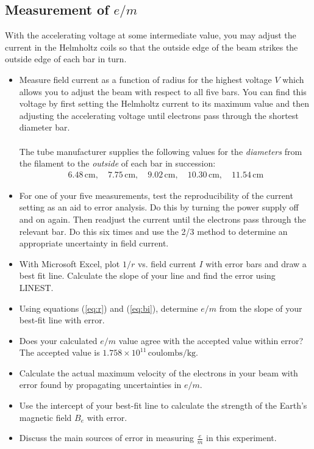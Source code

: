 \subsection{Measurement of $e/m$}
With the accelerating voltage at some intermediate value, you may adjust the current in the Helmholtz coils so that the outside edge of the beam strikes the outside edge of each bar in turn.
\begin{itemize}
  \item Measure field current as a function of radius for the highest voltage $V$ which allows you to adjust the beam with respect to all five bars. You can find this voltage by first setting the Helmholtz current to its maximum value and then adjusting the accelerating voltage until electrons pass through the shortest diameter bar.\\ \\

  The tube manufacturer supplies the following values for the \emph{diameters} from the filament to the \emph{outside} of each bar in succession:
  \begin{gather*}
  6.48\,\textrm{cm},\quad 7.75\,\textrm{cm},\quad 9.02\,\textrm{cm},\quad 10.30\,\textrm{cm},\quad 11.54\,\textrm{cm}
  \end{gather*}

  \item For one of your five measurements, test the reproducibility of the current setting as an aid to error analysis. Do this by turning the power supply off and on again. Then readjust the current until the electrons pass through the relevant bar. Do this six times and use the 2/3 method to determine an appropriate uncertainty in field current.

  \item With Microsoft Excel, plot $1/r$ vs. field current $I$ with error bars and draw a best fit line. Calculate the slope of your line and find the error using LINEST.

  \item Using equations ({\ref{eq:r}}) and ({\ref{eq:bi}}), determine $e/m$ from the slope of your best-fit line with error.

  \item Does your calculated $e/m$ value agree with the accepted value within error? The accepted value is $1.758 \times 10^{11}\, \mathrm{coulombs} / \mathrm{kg}$.

  \item Calculate the actual maximum velocity of the electrons in your beam with error found by propagating uncertainties in $e/m$.

  \item Use the intercept of your best-fit line to calculate the strength of the Earth's magnetic field $B_e$ with error.

  \item Discuss the main sources of error in measuring $\frac{e}{m}$ in this experiment.
\end{itemize}
